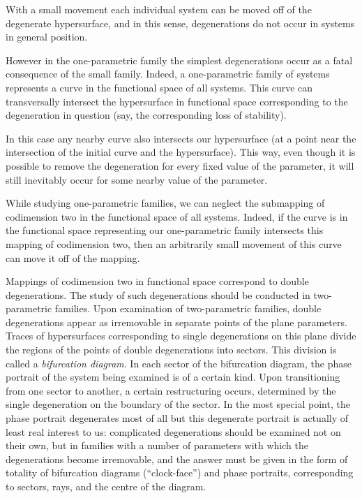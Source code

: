 \documentclass[12pt]{amsart}
\begin{document}
With a small movement each individual system can be moved off of the degenerate
hypersurface, and in this sense, degenerations do not occur in systems in
general position.

However in the one-parametric family the simplest degenerations occur as a fatal
consequence of the small family.
Indeed, a one-parametric family of systems represents a curve in the functional
space of all systems.
This curve can transversally intersect the hypersurface in functional space
corresponding to the degeneration in question (say, the corresponding loss of
stability).

In this case any nearby curve also intersects our hypersurface (at a point
near the intersection of the initial curve and the hypersurface).
This way, even though it is possible to remove the degeneration for every fixed
value of the parameter, it will still inevitably occur for some nearby value of
the parameter.

While studying one-parametric families, we can neglect the submapping of
codimension two in the functional space of all systems.
Indeed, if the curve is in the functional space representing our one-parametric
family intersects this mapping of codimension two, then an arbitrarily small
movement of this curve can move it off of the mapping.

Mappings of codimension two in functional space correspond to double
degenerations.
The study of such degenerations should be conducted in two-parametric families.
Upon examination of two-parametric families, double degenerations appear as
irremovable in separate points of the plane parameters.
Traces of hypersurfaces corresponding to single degenerations on this plane
divide the regions of the points of double degenerations into sectors.
This division is called a \textit{bifurcation diagram}.
In each sector of the bifurcation diagram, the phase portrait of the system
being examined is of a certain kind.
Upon transitioning from one sector to another, a certain restructuring occurs,
determined by the single degeneration on the boundary of the sector.
In the most special point, the phase portrait degenerates most of all but this
degenerate portrait is actually of least real interest to us: complicated
degenerations should be examined not on their own, but in families with a number
of parameters with which the degenerations become irremovable, and the answer
must be given in the form of totality of bifurcation diagrams (``clock-face'')
and phase portraits, corresponding to sectors, rays, and the centre of the
diagram.
\end{document}
